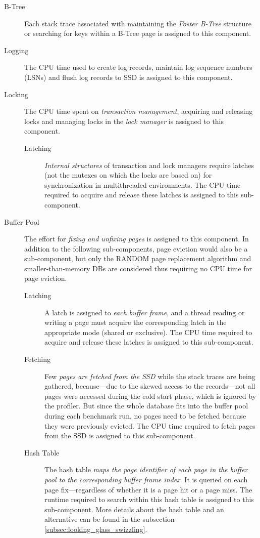 \begin{description}
    \item[B-Tree]       Each stack trace associated with maintaining the \emph{Foster B-Tree} structure or searching for keys within a B-Tree page is assigned to this component.
    \item[Logging]      The CPU time used to create log records, maintain log sequence numbers (LSNs) and flush log records to SSD is assigned to this component.
    \item[Locking]      The CPU time spent on \emph{transaction management}, acquiring and releasing locks and managing locks in the \emph{lock manager} is assigned to this component.
                        \begin{description}
                            \item[Latching] \emph{Internal structures} of transaction and lock managers require latches (not the mutexes on which the locks are based on) for synchronization in multithreaded environments. The CPU time required to acquire and release these latches is assigned to this sub-component.
                        \end{description}
    \item[Buffer Pool]  The effort for \emph{fixing and unfixing pages} is assigned to this component. In addition to the following sub-components, page eviction would also be a sub-component, but only the RANDOM page replacement algorithm and smaller-than-memory DBs are considered thus requiring no CPU time for page eviction.
                        \begin{description}
                            \item[Latching]     A latch is assigned to \emph{each buffer frame}, and a thread reading or writing a page must acquire the corresponding latch in the appropriate mode (shared or exclusive). The CPU time required to acquire and release these latches is assigned to this sub-component.
                            \item[Fetching]     Few \emph{pages are fetched from the SSD} while the stack traces are being gathered, because---due to the skewed access to the records---not all pages were accessed during the cold start phase, which is ignored by the profiler. But since the whole database fits into the buffer pool during each benchmark run, no pages need to be fetched because they were previously evicted. The CPU time required to fetch pages from the SSD is assigned to this sub-component.
                            \item[Hash Table]   The hash table \emph{maps the page identifier of each page in the buffer pool to the corresponding buffer frame index}. It is queried on each page fix---regardless of whether it is a page hit or a page miss. The runtime required to search within this hash table is assigned to this sub-component. More details about the hash table and an alternative can be found in the subsection \ref{subsec:looking_glass_swizzling}.

\end{description}
\end{description}
